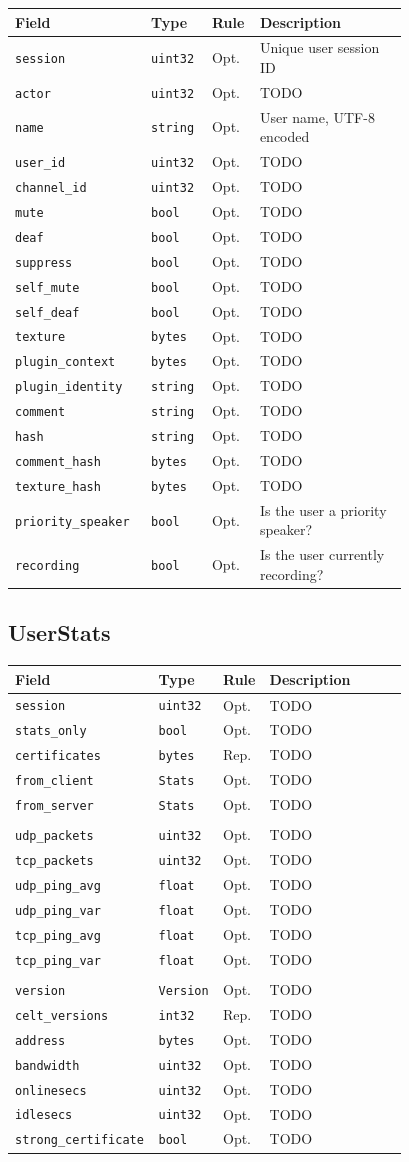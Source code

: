 \documentclass[11pt]{article} %
\newenvironment{mumbleMessageEx}
{%
	\small
	\renewcommand\arraystretch{1.5}
	\begin{tabular}{p{0.25\linewidth}p{0.13\linewidth}p{0.05\linewidth}p{0.35\linewidth}}
	Field & Type & Rule & Description \\
	\hline
}
{%
	\end{tabular}
	\renewcommand\arraystretch{1.0}
}
\newcommand{\mumbleMessageExItem}[4]{ \texttt{#1} & \texttt{#2} & #3 & #4 \\ }
\begin{document}
\begin{mumbleMessageEx}
\mumbleMessageExItem{session}{uint32}{Opt.}{Unique user session ID}
\mumbleMessageExItem{actor}{uint32}{Opt.}{TODO}
\mumbleMessageExItem{name}{string}{Opt.}{User name, UTF-8 encoded}
\mumbleMessageExItem{user\_id}{uint32}{Opt.}{TODO}
\mumbleMessageExItem{channel\_id}{uint32}{Opt.}{TODO}
\mumbleMessageExItem{mute}{bool}{Opt.}{TODO}
\mumbleMessageExItem{deaf}{bool}{Opt.}{TODO}
\mumbleMessageExItem{suppress}{bool}{Opt.}{TODO}
\mumbleMessageExItem{self\_mute}{bool}{Opt.}{TODO}
\mumbleMessageExItem{self\_deaf}{bool}{Opt.}{TODO}
\mumbleMessageExItem{texture}{bytes}{Opt.}{TODO}
\mumbleMessageExItem{plugin\_context}{bytes}{Opt.}{TODO}
\mumbleMessageExItem{plugin\_identity}{string}{Opt.}{TODO}
\mumbleMessageExItem{comment}{string}{Opt.}{TODO}
\mumbleMessageExItem{hash}{string}{Opt.}{TODO}
\mumbleMessageExItem{comment\_hash}{bytes}{Opt.}{TODO}
\mumbleMessageExItem{texture\_hash}{bytes}{Opt.}{TODO}
\mumbleMessageExItem{priority\_speaker}{bool}{Opt.}{Is the user a priority speaker?}
\mumbleMessageExItem{recording}{bool}{Opt.}{Is the user currently recording?}
\end{mumbleMessageEx}

\subsection{UserStats}

\begin{mumbleMessageEx}
\mumbleMessageExItem{session}{uint32}{Opt.}{TODO}
\mumbleMessageExItem{stats\_only}{bool}{Opt.}{TODO}
\mumbleMessageExItem{certificates}{bytes}{Rep.}{TODO}
\mumbleMessageExItem{from\_client}{Stats}{Opt.}{TODO}
\mumbleMessageExItem{from\_server}{Stats}{Opt.}{TODO}
\\
\mumbleMessageExItem{udp\_packets}{uint32}{Opt.}{TODO}
\mumbleMessageExItem{tcp\_packets}{uint32}{Opt.}{TODO}
\mumbleMessageExItem{udp\_ping\_avg}{float}{Opt.}{TODO}
\mumbleMessageExItem{udp\_ping\_var}{float}{Opt.}{TODO}
\mumbleMessageExItem{tcp\_ping\_avg}{float}{Opt.}{TODO}
\mumbleMessageExItem{tcp\_ping\_var}{float}{Opt.}{TODO}
\\
\mumbleMessageExItem{version}{Version}{Opt.}{TODO}
\mumbleMessageExItem{celt\_versions}{int32}{Rep.}{TODO}
\mumbleMessageExItem{address}{bytes}{Opt.}{TODO}
\mumbleMessageExItem{bandwidth}{uint32}{Opt.}{TODO}
\mumbleMessageExItem{onlinesecs}{uint32}{Opt.}{TODO}
\mumbleMessageExItem{idlesecs}{uint32}{Opt.}{TODO}
\mumbleMessageExItem{strong\_certificate}{bool}{Opt.}{TODO}
\end{mumbleMessageEx}
\end{document}
